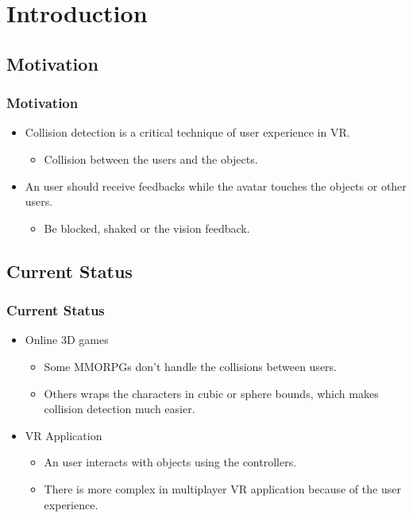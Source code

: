 \documentclass{beamer}
\begin{document}
\section{Introduction}

\subsection{Motivation}
	\begin{frame}
	\frametitle{Motivation}
	\begin{itemize}
		\item     Collision detection is a critical technique of user experience in VR.
            \begin{itemize}
                \item   Collision between the users and the objects.
            \end{itemize}
		\medskip
		\item     An user should receive feedbacks while the avatar touches the objects or other users.
            \begin{itemize}
                \item   Be blocked, shaked or the vision feedback.
            \end{itemize}
	\end{itemize}
	\end{frame}

\subsection{Current Status}
	\begin{frame}
	\frametitle{Current Status}
	\begin{itemize}
		\item Online 3D games
			\begin{itemize}
				\item Some MMORPGs don't handle the collisions between users.
				\item Others wraps the characters in cubic or sphere bounds, which makes collision detection much easier.
			\end{itemize}
		\medskip
		\item VR Application
			\begin{itemize}
				\item An user interacts with objects using the controllers.
				\item There is more complex in multiplayer VR application because of the user experience.
			\end{itemize}
	\end{itemize}
	\end{frame}
\end{document}

